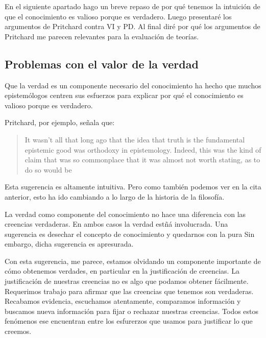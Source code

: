 {{{En el siguiente apartado hago un breve repaso de por qué tenemos la intuición de que el conocimiento es valioso porque es verdadero.
Luego presentaré los argumentos de Pritchard contra VI y PD.
Al final diré por qué los argumentos de Pritchard me parecen relevantes para la evaluación de teorías.

\subsection{Problemas con el valor de la verdad}

Que la verdad es un componente necesario del conocimiento ha hecho que muchos epistemólogos centren sus esfuerzos para explicar por qué el conocimiento es valioso porque es verdadero.

Pritchard, por ejemplo, señala que:

\begin{quote}
   It wasn’t all that long ago that the idea that truth is the fundamental epistemic good was orthodoxy in epistemology. Indeed, this was the kind of claim that was so commonplace that it was almost not worth stating, as to do so would be %
\end{quote}

Esta sugerencia es altamente intuitiva.
Pero como también podemos ver en la cita anterior, esto ha ido cambiando a lo largo de la historia de la filosofía.

La verdad como componente del conocimiento no hace una diferencia con las creencias verdaderas.
En ambos casos la verdad estñá involucrada.
Una sugerencia es desechar el concepto de conocimiento y quedarnos con la pura %
Sin embargo, dicha sugerencia es apresurada.

Con esta sugerencia, me parece, estamos olvidando un componente importante de cómo obtenemos verdades, en particular en la justificación de creencias.
La justificación de nuestras creencias no es algo que podamos obtener fácilmente.
Requerimos trabajo para afirmar que las creencias que tenemos son verdaderas.
Recabamos evidencia, escuchamos atentamente, comparamos información y buscamos nueva información para fijar o rechazar nuestras creencias.
Todos estos fenómenos ese encuentran entre los esfurerzos que usamos para justificar lo que creemos.

}}}
